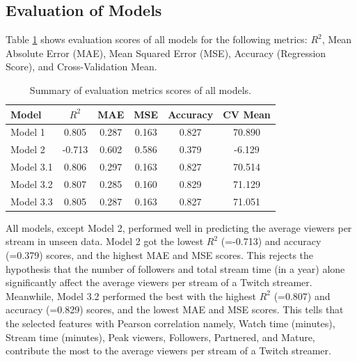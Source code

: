 \documentclass[runningheads]{llncs}
\begin{document}
\subsection{Evaluation of Models}

Table \ref{tab:eval} shows evaluation scores of all models for the following metrics: $ R^2 $, Mean Absolute Error (MAE), Mean Squared Error (MSE), Accuracy (Regression Score), and Cross-Validation Mean. \\

\begingroup
\setlength{\tabcolsep}{8pt} %
\renewcommand{\arraystretch}{1.2} %
\begin{table}[]
    \centering
    \caption{Summary of evaluation metrics scores of all models.}
    \begin{tabular}{|p{.15\linewidth}|c|c|c|c|c|}
        \hline
      \textbf{Model} & \textbf{ $ R^2 $} &	\textbf{MAE} & \textbf{MSE}	& \textbf{Accuracy} & \textbf{CV Mean}  \\
     \hline
     Model 1 & 0.805	& 0.287	& 0.163	& 0.827	& 70.890 \\
      \hline
     Model 2	& -0.713 &	0.602	& 0.586 & 0.379	&  -6.129 \\
      \hline
     Model 3.1	& 0.806 & 0.297	& 0.163 & 0.827 &	70.514 \\
    \hline
    Model 3.2 & 0.807	& 0.285	& 0.160  & 0.829	& 71.129 \\
    \hline 
    Model 3.3	& 0.805	& 0.287	& 0.163 & 0.827 & 71.051 \\
    \hline 
    \end{tabular}
    \label{tab:eval}
\end{table}
\endgroup 

All models, except Model 2, performed well in predicting the average viewers per stream in unseen data. Model 2 got the lowest $R^2$ (=-0.713) and accuracy (=0.379) scores, and the highest MAE and MSE scores. This rejects the hypothesis that the number of followers and total stream time (in a year) alone significantly affect the average viewers per stream of a Twitch streamer. \\

Meanwhile, Model 3.2 performed the best with the highest $R^2$ (=0.807) and accuracy (=0.829) scores, and the lowest MAE and MSE scores. This tells that the selected features with Pearson correlation namely, Watch time (minutes), Stream time (minutes), Peak viewers, Followers, Partnered, and Mature, contribute the most to the average viewers per stream of a Twitch streamer. \\
\end{document}
